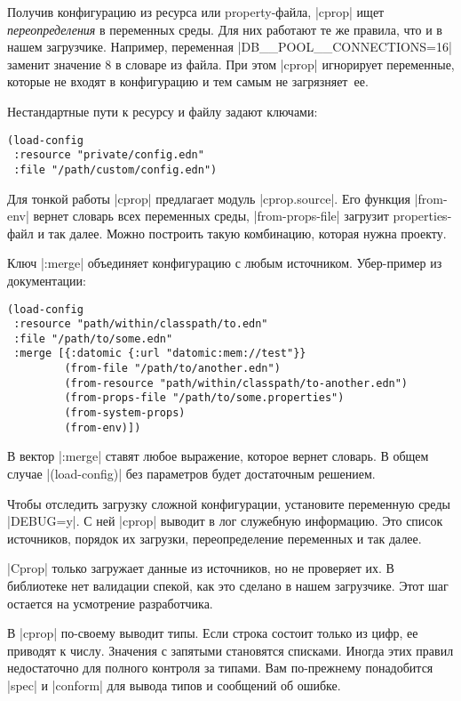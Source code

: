 Получив конфигурацию из ресурса или property-файла, \spverb|cprop| ищет
\emph{переопределения} в переменных среды. Для них работают те же правила, что и
в нашем загрузчике. Например, переменная \spverb|DB__POOL__CONNECTIONS=16|
заменит значение 8 в словаре из файла. При этом \spverb|cprop| игнорирует
переменные, которые не входят в конфигурацию и тем самым не загрязняет~ее.

Нестандартные пути к ресурсу и файлу задают ключами:

\begin{verbatim}
(load-config
 :resource "private/config.edn"
 :file "/path/custom/config.edn")
\end{verbatim}

Для тонкой работы \spverb|cprop| предлагает модуль \spverb|cprop.source|. Его
функция \spverb|from-env| вернет словарь всех переменных среды,
\spverb|from-props-file| загрузит properties-файл и так далее. Можно построить
такую комбинацию, которая нужна проекту.

Ключ \spverb|:merge| объединяет конфигурацию с любым источником. Убер-пример из
документации:

\begin{verbatim}
(load-config
 :resource "path/within/classpath/to.edn"
 :file "/path/to/some.edn"
 :merge [{:datomic {:url "datomic:mem://test"}}
         (from-file "/path/to/another.edn")
         (from-resource "path/within/classpath/to-another.edn")
         (from-props-file "/path/to/some.properties")
         (from-system-props)
         (from-env)])
\end{verbatim}

В вектор \spverb|:merge| ставят любое выражение, которое вернет словарь. В общем
случае \spverb|(load-config)| без параметров будет достаточным решением.

Чтобы отследить загрузку сложной конфигурации, установите переменную среды
\spverb|DEBUG=y|. С ней \spverb|cprop| выводит в лог служебную информацию. Это
список источников, порядок их загрузки, переопределение переменных и так далее.

\spverb|Cprop| только загружает данные из источников, но не проверяет их. В
библиотеке нет валидации спекой, как это сделано в нашем загрузчике. Этот шаг
остается на усмотрение разработчика.

В \spverb|cprop| по-своему выводит типы. Если строка состоит только из цифр, ее
приводят к числу. Значения с запятыми становятся списками. Иногда этих правил
недостаточно для полного контроля за типами. Вам по-прежнему понадобится
\spverb|spec| и \spverb|conform| для вывода типов и сообщений об ошибке.

